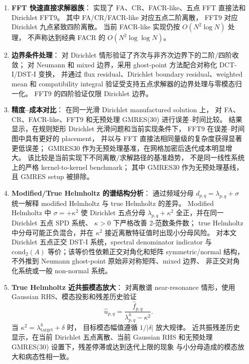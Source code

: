 \begin{enumerate}[itemsep=2pt]
  \item \textbf{FFT 快速直接求解器族}：
        实现了 FA、CR、FACR-like、五点 FFT 直接法和 Dirichlet FFT9。
        其中 FA/CR/FACR-like 对应五点二阶离散，
        FFT9 对应 Dirichlet 九点紧致四阶离散。
        当前 FACR-like 实现仍按 $O(N^2\log N)$ 处理，
        不声称达到经典 FACR 的 $O(N^2\log\log N)$。

  \item \textbf{边界条件处理}：
        对 Dirichlet 情形验证了齐次与非齐次边界下的二阶/四阶收敛；
        对 Neumann 和 mixed 边界，采用 ghost-point 方法配合对称化 DCT-I/DST-I 变换，
        并通过 flux residual、Dirichlet boundary residual、weighted mean 和 compatibility integral
        验证受支持五点求解器的边界处理与零模态归一化。
        FFT9 的四阶验证仅限 Dirichlet 边界。

  \item \textbf{精度--成本对比}：
        在同一光滑 Dirichlet manufactured solution 上，
        对 FA、CR、FACR-like、FFT9 和无预处理 GMRES(30) 进行误差--时间比较。
        结果显示，在规则矩形 Dirichlet 光滑问题和当前实现条件下，
        FFT9 在误差--时间图中具有更好的 placement，
        并以与 FFT 直接法相同量级的复杂度获得显著更低误差；
        GMRES30 作为无预处理基准，在网格加密后迭代成本明显增大。
        该比较是当前实现下不同离散/求解路径的基准趋势，
        不是同一线性系统上的严格 kernel-to-kernel benchmark；
        其中 GMRES30 作为无预处理基线，且 GMRES setup 被排除。

  \item \textbf{Modified/True Helmholtz 的谱结构分析}：
        通过频域分母
        $d_{p,q}=\lambda_{p,q}+\sigma$
        统一解释 modified Helmholtz 与 true Helmholtz 的差异。
        Modified Helmholtz 中 $\sigma=+\kappa^2$ 使 Dirichlet 五点分母
        $\lambda_{p,q}+\kappa^2$ 全正，并在同一 Dirichlet 五点 SPD 系统、
        $\kappa>0$ 下严格改善 2-范数条件数；
        true Helmholtz 中分母可能正负混合，并在 $\kappa^2$ 接近离散特征值时出现小分母风险。
        对本文 Dirichlet 五点正交 DST-I 系统，spectral denominator indicator
        与 $\mathrm{cond}_2(A)$ 等价；该等价性依赖正交对角化和矩阵 symmetric/normal 结构，
        不外推到 Neumann ghost-point 原始非对称矩阵、mixed 边界、
        非正交对角化系统或一般 non-normal 系统。

  \item \textbf{True Helmholtz 近共振模态放大}：
        对离散谱 near-resonance 情形，使用 Gaussian RHS、模态投影和残差历史验证
        \[
          \hat u_{p,q}=\frac{\hat f_{p,q}}{\lambda_{p,q}^h-\kappa^2}.
        \]
        当 $\kappa^2=\lambda_{\mathrm{target}}^h+\delta$ 时，
        目标模态幅值遵循 $1/|\delta|$ 放大规律。
        近共振残差历史显示，在当前 Dirichlet 五点离散、当前 Gaussian RHS
        和无预处理 GMRES(30) 设置下，残差停滞或达到迭代上限的现象
        与小分母造成的模态放大和病态性相一致。


\end{enumerate}
